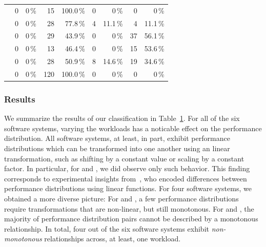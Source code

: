 {\begin{table}
\begin{tabular}{lrrrrrrrr}
	\jumper & 
	0 & 0\,\% & 
	\cellcolor{lt-color!100!white}15 & \cellcolor{lt-color!100!white}100.0\,\% & 
	0 & 0\,\% & 
	0 & 0\,\%\\
	
	\kanzi & 
	0 & 0\,\% & 
	\cellcolor{lt-color!78!white}28 & \cellcolor{lt-color!78!white}77.8\,\% & 
	\cellcolor{xmt-color!11!white}	4& \cellcolor{xmt-color!11!white}11.1\,\% & 
	\cellcolor{nmt-color!11!white}4 & \cellcolor{nmt-color!11!white}11.1\,\%\\
	
	\dconvert & 
	0 & 0\,\% & 
	\cellcolor{lt-color!43!white}29 & \cellcolor{lt-color!43!white}43.9\,\% & 
	0 & 0\,\% & 
	\cellcolor{nmt-color!56!white}37 & \cellcolor{nmt-color!56!white}56.1\,\%\\
	
	\htwo & 
	0& 0\,\% & 
	\cellcolor{lt-color!47!white}13 & \cellcolor{lt-color!47!white}46.4\,\% & 
	0 & 0\,\% & 
	\cellcolor{nmt-color!53!white}15 & \cellcolor{nmt-color!53!white}53.6\,\%\\
	
	\batik & 
	0 & 0\,\% & 
	\cellcolor{lt-color!50!white}28 & \cellcolor{lt-color!50!white}50.9\,\% & 
	\cellcolor{xmt-color!14!white}8 & \cellcolor{xmt-color!14!white}14.6\,\% & 
	\cellcolor{nmt-color!34!white}19 & \cellcolor{nmt-color!34!white}34.6\,\%\\
	
	\jadx & 
	0 & 0\,\% & 
	\cellcolor{lt-color!100!white}120 & \cellcolor{lt-color!100!white}100.0\,\% & 
	0 & 0\,\% & 
	0 & 0\,\%\\
	
	\bottomrule
	\end{tabular}
	\label{tab:categorization_counts}
\end{table}
\subsubsection{Results}
We summarize the results of our classification in Table~\ref{tab:categorization_counts}. For all of the six software systems, varying the workloads has a noticable effect on the performance distribution. All software systems, at least, in part, exhibit performance distributions which can be transformed into one another using an linear  transformation, such as shifting by a constant value or scaling by a constant factor. In particular, for \jumper and \jadx, we did  observe only such behavior. This finding corresponds to experimental insights from~\citeauthor{jamishidi_transfer_2017}, who encoded differences between performance distributions using linear functions. For four software systems, we obtained a more diverse picture: For \kanzi and \batik, a few performance distributions require transformations that are non-linear, but still monotonous. For \dconvert and \htwo, the majority of performance distribution pairs cannot be described by a monotonous relationship. In total, four out of the six software systems exhibit \emph{non-monotonous} relationships across, at least, one workload.

}
